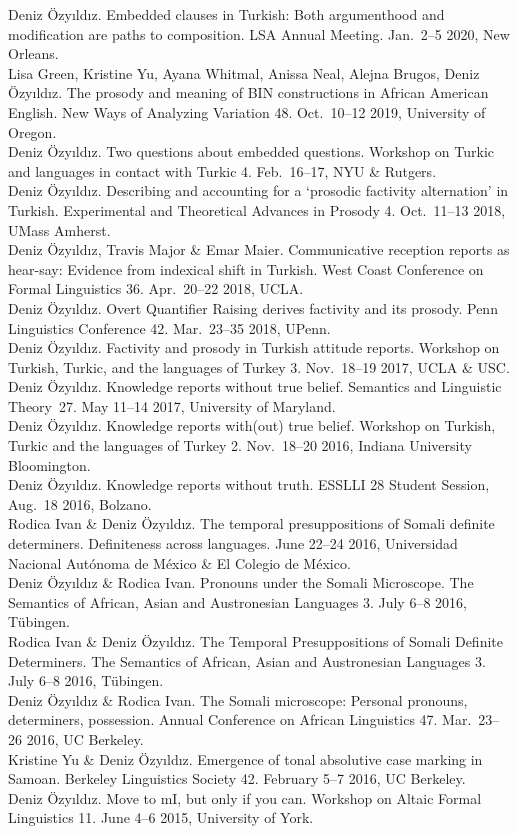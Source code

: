 \documentclass[11pt, a4paper]{article} %
\newcommand{\years}[1]{\marginnote{\scriptsize #1}} %
\newcommand{\me}{Deniz \"Ozy\i{}ld\i{}z}
\begin{document}
\years{2020} \me. Embedded clauses in Turkish: Both argumenthood and modification are paths to composition. LSA Annual Meeting. Jan.\ 2--5 2020, New Orleans.\\[.25em]
\years{2019}  Lisa Green, Kristine Yu, Ayana Whitmal, Anissa Neal, Alejna Brugos, Deniz \"Ozy\i{}ld\i{}z. The prosody and meaning of BIN constructions in African American English. New Ways of Analyzing Variation 48. Oct.\ 10--12 2019, University of Oregon.\\ [.25em]
\me. Two questions about embedded questions. Workshop on Turkic and languages in contact with Turkic 4. Feb.\ 16--17, NYU \& Rutgers.\\[.25em]
\me. Describing and accounting for a `prosodic factivity alternation' in Turkish.  Experimental and Theoretical Advances in Prosody 4. Oct.\ 11--13 2018, UMass Amherst.\\[.25em]
\me, Travis Major \& Emar Maier. Communicative reception reports as hear-say: Evidence from indexical shift in Turkish. West Coast Conference on Formal Linguistics 36. Apr.\ 20--22 2018, UCLA.\\[.25em]
\me. Overt Quantifier Raising derives factivity and its prosody. Penn Linguistics Conference 42. Mar.\ 23--35 2018, UPenn.\\[.25em]
\years{2017} \me. Factivity and prosody in Turkish attitude reports. Workshop on Turkish, Turkic, and the languages of Turkey 3. Nov.\ 18--19 2017, UCLA \& USC.\\[.25em]
\me. Knowledge reports without true belief. Semantics and Linguistic Theory~27.
May 11--14 2017, University of Maryland.\\[.25em]
\years{2016} \me. Knowledge reports with(out) true belief. Workshop on Turkish, Turkic and the languages of Turkey 2. Nov.\ 18--20 2016, Indiana University Bloomington.\\[.25em]
\me. Knowledge reports without truth. ESSLLI 28 Student Session, Aug.\ 18 2016, Bolzano.\\[.25em]
Rodica Ivan \& Deniz \"Ozy\i{}ld\i{}z. The temporal presuppositions of Somali definite determiners. Definiteness across languages. June 22--24 2016, Universidad Nacional Aut\'onoma de M\'exico \& El Colegio de M\'exico.\\[.25em]
\me{} \& Rodica Ivan. Pronouns under the Somali Microscope. The Semantics of African, Asian and Austronesian Languages 3. July 6--8 2016, T\"ubingen.\\[.25em]
Rodica Ivan \& Deniz \"Ozy\i{}ld\i{}z. The Temporal Presuppositions of Somali Definite Determiners. The Semantics of African, Asian and Austronesian Languages 3. July 6--8 2016, T\"ubingen.\\[.25em]
\years{} \me{} \& Rodica Ivan. {The Somali microscope: Personal pronouns,
determiners, possession}. Annual Conference on African Linguistics 47. Mar.\ 23--26 2016, UC Berkeley.\\[.25em]
Kristine Yu \& Deniz \"Ozy\i{}ld\i{}z. Emergence of tonal absolutive case marking in Samoan. Berkeley Linguistics Society 42. February 5--7 2016, UC Berkeley.\\[.25em]
\years{2015} \me. {Move to mI, but only if you can}. Workshop on Altaic Formal Linguistics 11. June 4--6 2015, University of York.
\end{document}

